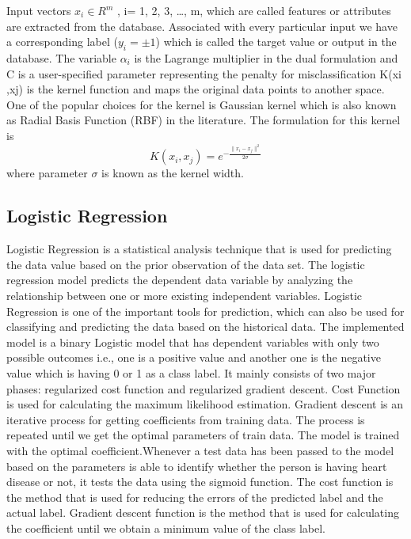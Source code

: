 \documentclass[oneside,12pt]{Classes/VTU}
\begin{document}
    	Input vectors $x_i \in R^m$ , i= 1, 2, 3, …, m, which are called features or attributes are extracted from the database. Associated with every particular input we have a corresponding label ($ y_i = \pm 1$) which is called the target value or output in the database. The variable $\alpha_i$ is the Lagrange multiplier in the dual formulation and C is a user-specified parameter representing the penalty for misclassification K(xi ,xj) is the kernel function and maps the original data points to another space.  One of the popular choices for the kernel is Gaussian kernel which is also known as Radial Basis Function (RBF) in the literature. The formulation for this kernel is
    	\[ K(x_i, x_j) = e^{-\frac{\parallel{x_i - x_j}\parallel^2}{2\sigma}} \]
    	where parameter $\sigma$ is known as the kernel width. 
    	
    	
    	
    	\subsection{Logistic Regression}
    	Logistic Regression is a statistical analysis technique that is used for predicting the data value based on the prior observation of the data set. The logistic regression model predicts the dependent data variable by analyzing the relationship between one or more existing independent variables. Logistic Regression is one of the important tools for prediction, which can also be used for classifying and predicting the data based on the historical data. The implemented model is a binary Logistic model that has dependent variables with only two possible outcomes i.e., one is a positive value and another one is the negative value which is having 0 or 1 as a class label.
    	It mainly consists of two major phases: regularized cost function and regularized gradient descent. Cost Function is used for calculating the maximum likelihood estimation. Gradient descent is an iterative process for getting coefficients from training
    	data. The process is repeated until we get the optimal parameters of train data. The model is trained with the optimal coefficient.Whenever a test data has been passed to the model based on the parameters is able to identify whether the person is having heart disease or not, it tests the data using the sigmoid function. The cost function is the method that is used for reducing the errors of the predicted label and the actual label. Gradient descent function is the method that is used for calculating the coefficient until we obtain a minimum value of the class label.
    	
\end{document}
